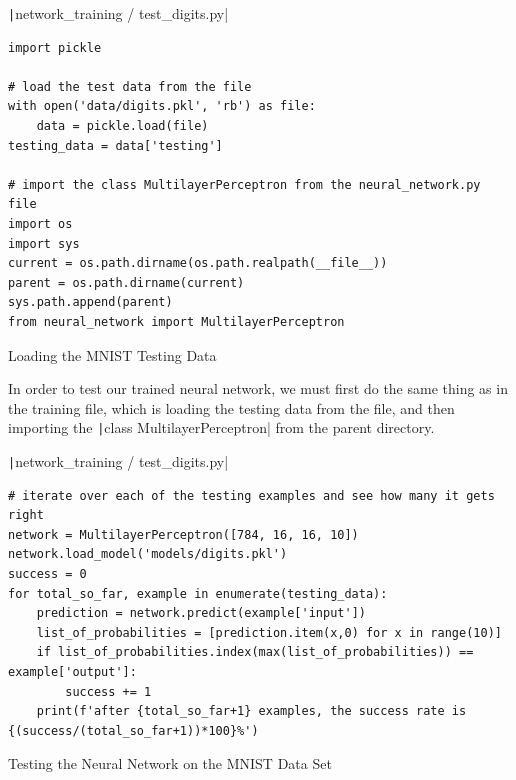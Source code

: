 \documentclass[12pt]{report}
\newcommand{\pil}[1]{\protect\texttt|#1|}
\begin{document}
\begin{listing}[H]
\pil{network_training / test_digits.py}
\begin{verbatim}
import pickle

# load the test data from the file
with open('data/digits.pkl', 'rb') as file:
    data = pickle.load(file)
testing_data = data['testing']

# import the class MultilayerPerceptron from the neural_network.py file
import os
import sys
current = os.path.dirname(os.path.realpath(__file__))
parent = os.path.dirname(current)
sys.path.append(parent)
from neural_network import MultilayerPerceptron
\end{verbatim}
\caption{Loading the MNIST Testing Data}\label{cs:loadTestMNIST}
\end{listing}

In order to test our trained neural network, we must first do the same thing as in the training file, which is loading the testing data from the file, and then importing the \pil{class MultilayerPerceptron} from the parent directory.

\begin{center}
\end{center}

\begin{listing}[H]
\pil{network_training / test_digits.py}
\begin{verbatim}
# iterate over each of the testing examples and see how many it gets right
network = MultilayerPerceptron([784, 16, 16, 10])
network.load_model('models/digits.pkl')
success = 0
for total_so_far, example in enumerate(testing_data):
    prediction = network.predict(example['input'])
    list_of_probabilities = [prediction.item(x,0) for x in range(10)]
    if list_of_probabilities.index(max(list_of_probabilities)) == example['output']:
        success += 1
    print(f'after {total_so_far+1} examples, the success rate is {(success/(total_so_far+1))*100}%')
\end{verbatim}
\caption{Testing the Neural Network on the MNIST Data Set}\label{cs:testOnMNIST}
\end{listing}
\end{document}
